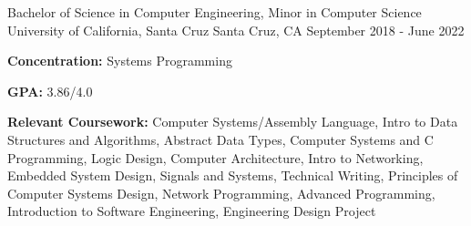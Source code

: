 
\begin{cventries}
  \cventry
    {Bachelor of Science in Computer Engineering, Minor in Computer Science} %
    {University of California, Santa Cruz} %
    {Santa Cruz, CA} %
    {September 2018 - June 2022} %
    {
    \begin{cvitems}
        \item {\textbf{Concentration:} Systems Programming}
        \vspace{0.5mm}
        \item {\textbf{GPA:} 3.86/4.0}
        \item {\textbf{Relevant Coursework:} Computer Systems/Assembly Language, Intro to Data Structures and Algorithms, Abstract Data Types, Computer Systems and C Programming, Logic Design, Computer Architecture, Intro to Networking, Embedded System Design, Signals and Systems, Technical Writing, Principles of Computer Systems Design, Network Programming, Advanced Programming, Introduction to Software Engineering, Engineering Design Project}
    \end{cvitems}
    }
\end{cventries}
